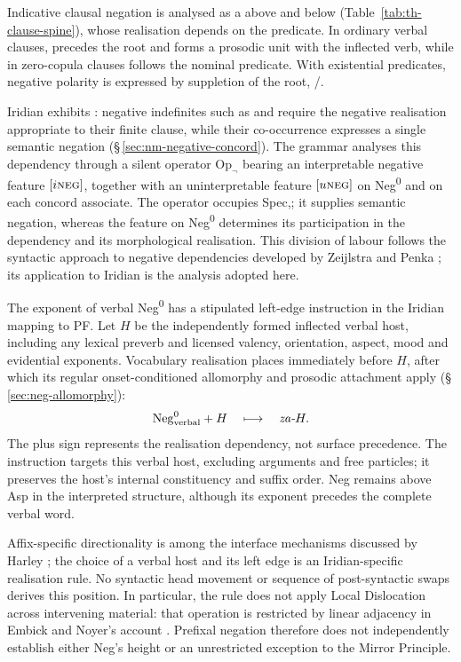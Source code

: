 Indicative clausal negation is analysed as a  above
 and below 
(Table~\ref{tab:th-clause-spine}), whose realisation depends on the predicate.
In ordinary verbal clauses,  precedes the root and forms a prosodic
unit with the inflected verb, while in zero-copula clauses  follows
the nominal predicate. With existential predicates, negative polarity is
expressed by suppletion of the root, /.

Iridian exhibits : negative indefinites such as
  and   require the
negative realisation appropriate to their finite clause, while their
co-occurrence expresses a single semantic negation
(§\,\ref{sec:nm-negative-concord}). The grammar analyses this dependency through
a silent operator $\mathrm{Op}_{\neg}$ bearing an interpretable negative
feature $[i\textsc{neg}]$, together with an uninterpretable feature
$[u\textsc{neg}]$ on Neg\textsuperscript{0} and on each concord associate.
The operator occupies Spec,; it supplies semantic negation,
whereas the feature on Neg\textsuperscript{0} determines its participation in
the dependency and its morphological realisation. This division of labour
follows the syntactic approach to negative dependencies developed by
Zeijlstra and Penka \cite{zeijlstra2022,penka2011}; its application to Iridian is the analysis
adopted here.

The exponent of verbal Neg\textsuperscript{0} has a stipulated left-edge
instruction in the Iridian mapping to PF. Let $H$ be the independently formed
inflected verbal host, including any lexical preverb and licensed valency,
orientation, aspect, mood and evidential exponents. Vocabulary realisation
places  immediately before $H$, after which its regular onset-conditioned
allomorphy and prosodic attachment apply (§\,\ref{sec:neg-allomorphy}):
\[
 \mathrm{Neg}^{0}_{\text{verbal}}+H
 \quad\longmapsto\quad \textit{za-}H.
\]
The plus sign represents the realisation dependency, not surface precedence.
The instruction targets this verbal host, excluding arguments and free
particles; it preserves the host's internal constituency and suffix order.
Neg remains above Asp in the interpreted structure, although its exponent
precedes the complete verbal word.

Affix-specific directionality is among the interface mechanisms discussed by
Harley \cite{harley2011}; the choice of a verbal host and its left edge is an
Iridian-specific realisation rule. No syntactic head movement or sequence of
post-syntactic swaps derives this position. In particular, the rule does not
apply Local Dislocation across intervening material: that operation is
restricted by linear adjacency in Embick and Noyer's account
\cite{embicknoyer2007}. Prefixal negation therefore does not independently
establish either Neg's height or an unrestricted exception to the Mirror
Principle.

